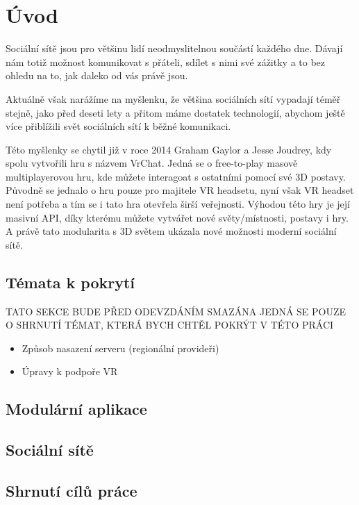 \chapter{Úvod}

Sociální sítě jsou pro většinu lidí neodmyslitelnou součástí každého dne.
Dávají nám totiž možnost komunikovat s přáteli, sdílet s nimi své zážitky
a to bez ohledu na to, jak daleko od vás právě jsou.

Aktuálně však narážíme na myšlenku, že většina sociálních sítí vypadají téměř stejně,
jako před deseti lety a přitom máme dostatek technologií, abychom ještě více přiblížili svět
sociálních sítí k běžné komunikaci.

Této myšlenky se chytil již v roce 2014 Graham Gaylor a Jesse Joudrey, kdy spolu vytvořili
hru s názvem VrChat. Jedná se o free-to-play masově multiplayerovou hru, kde můžete interagoat
s ostatními pomocí své 3D postavy. Původně se jednalo o hru pouze pro majitele VR headsetu, nyní
však VR headset není potřeba a tím se i tato hra otevřela širší veřejnosti. Výhodou této hry
je její masivní API, díky kterému můžete vytvářet nové světy/místnosti, postavy i hry.
A právě tato modularita s 3D světem ukázala nové možnosti moderní sociální sítě.

\section{Témata k pokrytí}
TATO SEKCE BUDE PŘED ODEVZDÁNÍM SMAZÁNA
JEDNÁ SE POUZE O SHRNUTÍ TÉMAT, KTERÁ BYCH CHTĚL POKRÝT V TÉTO PRÁCI
\begin{itemize}
    \item Způsob nasazení serveru (regionální provideři)
    \item Úpravy k podpoře VR
\end{itemize}
\section{Modulární aplikace}

\section{Sociální sítě}

\section{Shrnutí cílů práce}
